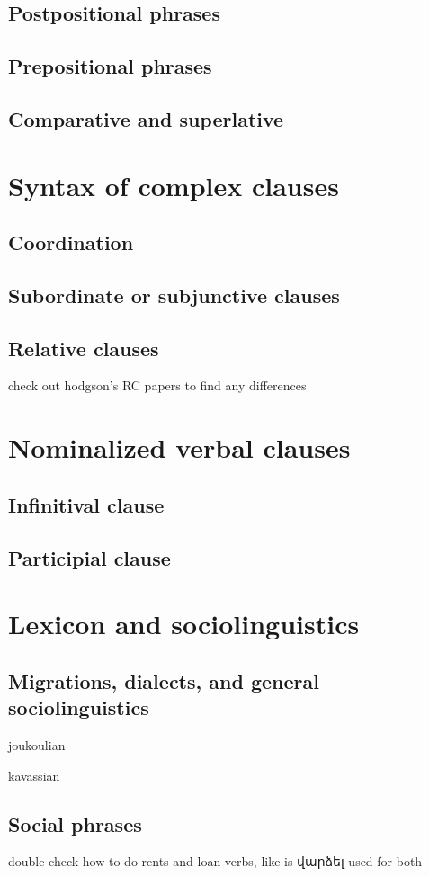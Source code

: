 \chapter{Postpositional phrases}
\chapter{Prepositional phrases}
\chapter{Comparative and superlative}
\part{Syntax of complex clauses}
\chapter{Coordination}
\chapter{Subordinate or subjunctive clauses}
\chapter{Relative clauses}
check out hodgson's RC papers to find any differences 
\part{Nominalized verbal clauses}
\chapter{Infinitival clause}
\chapter{Participial clause}

\part{Lexicon and sociolinguistics}
\chapter{Migrations, dialects, and general sociolinguistics}

joukoulian

kavassian
\chapter{Social phrases}
double check how to do rents and loan verbs, like is վարձել used for both
